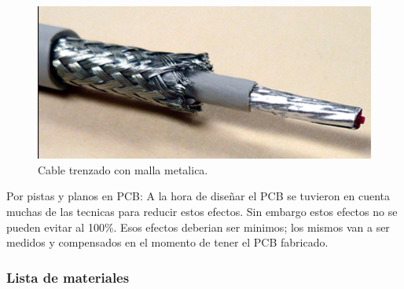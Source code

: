 \documentclass[a4paper,12pt,twoside]{article}
\begin{document}
\begin{figure}[H]
    \centering
    \includegraphics[height=0.31415\textwidth]{img/cable_malla_trenzada.jpg}
    \caption{Cable trenzado con malla metalica.}
    \label{fig:cable_malla}
\end{figure}



Por pistas y planos en PCB:
\newline
\newline
A la hora de diseñar el PCB se tuvieron en cuenta muchas de las tecnicas para reducir estos efectos. Sin embargo estos efectos no se pueden evitar al 100\%. Esos efectos deberian ser minimos; los mismos van a ser medidos y compensados en el momento de tener el PCB fabricado.

\newpage

\subsubsection{Lista de materiales}
\end{document}
